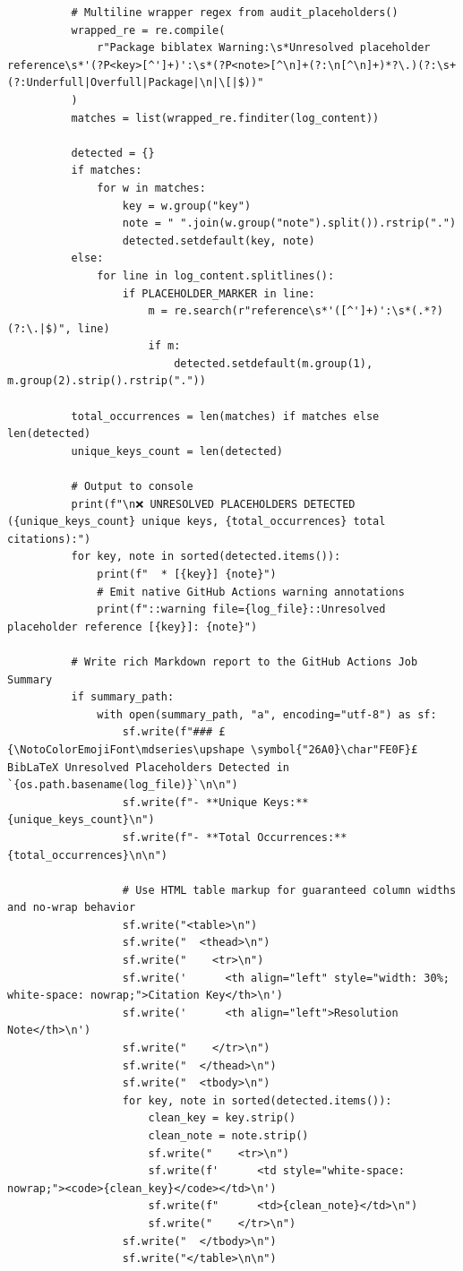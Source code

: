 \documentclass[12pt, twoside]{article}
\begin{document}
\begin{lstlisting}
          # Multiline wrapper regex from audit_placeholders()
          wrapped_re = re.compile(
              r"Package biblatex Warning:\s*Unresolved placeholder reference\s*'(?P<key>[^']+)':\s*(?P<note>[^\n]+(?:\n[^\n]+)*?\.)(?:\s+(?:Underfull|Overfull|Package|\n|\[|$))"
          )
          matches = list(wrapped_re.finditer(log_content))

          detected = {}
          if matches:
              for w in matches:
                  key = w.group("key")
                  note = " ".join(w.group("note").split()).rstrip(".")
                  detected.setdefault(key, note)
          else:
              for line in log_content.splitlines():
                  if PLACEHOLDER_MARKER in line:
                      m = re.search(r"reference\s*'([^']+)':\s*(.*?)(?:\.|$)", line)
                      if m:
                          detected.setdefault(m.group(1), m.group(2).strip().rstrip("."))

          total_occurrences = len(matches) if matches else len(detected)
          unique_keys_count = len(detected)

          # Output to console
          print(f"\n❌ UNRESOLVED PLACEHOLDERS DETECTED ({unique_keys_count} unique keys, {total_occurrences} total citations):")
          for key, note in sorted(detected.items()):
              print(f"  * [{key}] {note}")
              # Emit native GitHub Actions warning annotations
              print(f"::warning file={log_file}::Unresolved placeholder reference [{key}]: {note}")

          # Write rich Markdown report to the GitHub Actions Job Summary
          if summary_path:
              with open(summary_path, "a", encoding="utf-8") as sf:
                  sf.write(f"### £{\NotoColorEmojiFont\mdseries\upshape \symbol{"26A0}\char"FE0F}£ BibLaTeX Unresolved Placeholders Detected in `{os.path.basename(log_file)}`\n\n")
                  sf.write(f"- **Unique Keys:** {unique_keys_count}\n")
                  sf.write(f"- **Total Occurrences:** {total_occurrences}\n\n")
                  
                  # Use HTML table markup for guaranteed column widths and no-wrap behavior
                  sf.write("<table>\n")
                  sf.write("  <thead>\n")
                  sf.write("    <tr>\n")
                  sf.write('      <th align="left" style="width: 30%; white-space: nowrap;">Citation Key</th>\n')
                  sf.write('      <th align="left">Resolution Note</th>\n')
                  sf.write("    </tr>\n")
                  sf.write("  </thead>\n")
                  sf.write("  <tbody>\n")
                  for key, note in sorted(detected.items()):
                      clean_key = key.strip()
                      clean_note = note.strip()
                      sf.write("    <tr>\n")
                      sf.write(f'      <td style="white-space: nowrap;"><code>{clean_key}</code></td>\n')
                      sf.write(f"      <td>{clean_note}</td>\n")
                      sf.write("    </tr>\n")
                  sf.write("  </tbody>\n")
                  sf.write("</table>\n\n")


\end{lstlisting}
\end{document}
